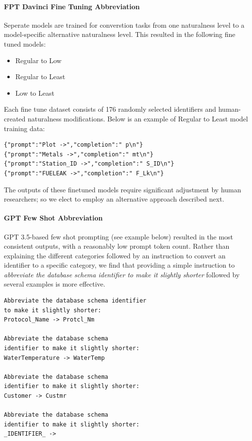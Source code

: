 \paragraph{\textbf{FPT Davinci Fine Tuning Abbreviation}}

Seperate models are trained for converstion tasks from one naturalness level to a model-specific alternative naturalness level.
This resulted in the following fine tuned models:

\begin{itemize}
  \item Regular to Low
  \item Regular to Least
  \item Low to Least
\end{itemize}

Each fine tune dataset consists of 176 randomly selected identifiers and human-created naturalness modifications.
Below is an example of Regular to Least model training data:
\begin{verbatim}
{"prompt":"Plot ->","completion":" p\n"}
{"prompt":"Metals ->","completion":" mt\n"}
{"prompt":"Station_ID ->","completion":" S_ID\n"}
{"prompt":"FUELEAK ->","completion":" F_Lk\n"}
\end{verbatim} 

The outputs of these finetuned models require significant adjustment by human researchers; so we elect to employ an alternative approach described next.

\paragraph{\textbf{GPT Few Shot Abbreviation}}

GPT 3.5-based few shot prompting (see example below) resulted in the most consistent outputs, with a reasonably low prompt token count.
Rather than explaining the different categories followed by an instruction to convert an identifier to a specific category, we find that providing a simple instruction to \emph{abbreviate the database schema identifier to make it slightly shorter} followed by several examples is more effective.

\begin{verbatim}
Abbreviate the database schema identifier 
to make it slightly shorter:
Protocol_Name -> Protcl_Nm

Abbreviate the database schema 
identifier to make it slightly shorter:
WaterTemperature -> WaterTemp

Abbreviate the database schema
identifier to make it slightly shorter:
Customer -> Custmr

Abbreviate the database schema 
identifier to make it slightly shorter:
_IDENTIFIER_ ->
\end{verbatim}

